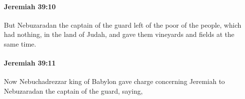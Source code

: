 		\paragraph{Jeremiah 39:10} %
			\label{JEREMIAH-39-10}

			But Nebuzaradan the captain of the guard left of the poor of the people, which had nothing, in the land of Judah, and gave them vineyards and fields at the same time.


		\paragraph{Jeremiah 39:11} %
			\label{JEREMIAH-39-11}

			Now Nebuchadrezzar king of Babylon gave charge concerning Jeremiah to Nebuzaradan the captain of the guard, saying,



